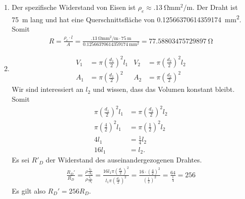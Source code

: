 \documentclass{article}
\begin{document}
\begin{enumerate}
    \item Der spezifische Widerstand von Eisen ist $\rho_e \approx \qty{.13}{\ohm\mm\squared\per\m}$. Der Draht ist \qty{75}{\m} lang und hat eine Querschnittsfläche von \qty{0.12566370614359174}{\mm\squared}. Somit
    \begin{align*}
        R = \frac{\rho_e \cdot l}{A} = \frac{\qty{.13}{\ohm\mm\squared\per\m} \cdot \qty{75}{\m}}{\qty{0.12566370614359174}{\mm\squared}} = \qty{77.58803475729897}{\ohm}
    \end{align*}

    \item
    \begin{align*}
        V_1 &= \pi \left(\frac{d_1}{2}\right)^2 l_1 & V_2 &= \pi \left(\frac{d_2}{2}\right)^2 l_2 \\
        A_1 &= \pi \left(\frac{d_1}{2}\right)^2 & A_2 &= \pi \left(\frac{d_2}{2}\right)^2
    \end{align*}
    Wir sind interessiert an $l_2$ und wissen, dass das Volumen konstant bleibt. Somit
    \begin{align*}
        \pi \left(\frac{d_1}{2}\right)^2 l_1 &= \pi \left(\frac{d_2}{2}\right)^2 l_2 \\
        \pi \left(\frac{4}{2}\right)^2 l_1 &= \pi \left(\frac{1}{2}\right)^2 l_2 \\
        4l_1 &= \frac{1}{4}l_2 \\
        16l_1 &= l_2.
    \end{align*}
    Es sei $R'_D$ der Widerstand des auseinandergezogenen Drahtes.
    \begin{align*}
        \frac{R_D'}{R_D} = 
        \frac{\rho \frac{l_2}{A_2}}{\rho \frac{l_1}{A_1}} = 
        \frac{16l_1 \pi \left(\frac{d_1}{2}\right)^2}{l_1\pi \left(\frac{d_2}{2}\right)^2} =
        \frac{16 \cdot \left(\frac{4}{2}\right)^2}{\left(\frac{1}{2}\right)^2} =
        \frac{64}{\frac{1}{4}} =
        256
    \end{align*}
    Es gilt also $R_D' = 256R_D$.
\end{enumerate}
\end{document}
